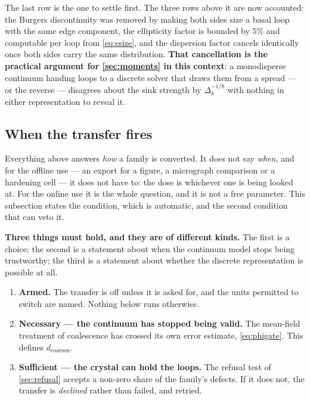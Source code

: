 \documentclass{article}
\begin{document}
The last row is the one to settle first. The three rows above it are now
accounted: the Burgers discontinuity was removed by making both sides size a
basal loop with the same edge component, the ellipticity factor is bounded by
$5\%$ and computable per loop from \cref{eq:esize}, and the dispersion factor
cancels identically once both sides carry the same distribution. \textbf{That
cancellation is the practical argument for \cref{sec:moments} in this
context}: a monodisperse continuum handing loops to a discrete solver that draws
them from a spread --- or the reverse --- disagrees about the sink strength by
$\Delta_k^{-1/8}$ with nothing in either representation to reveal it.


\subsection{When the transfer fires}
\label{sec:trigger}

Everything above answers \emph{how} a family is converted. It does not say
\emph{when}, and for the offline use --- an export for a figure, a micrograph
comparison or a hardening cell --- it does not have to: the dose is whichever one
is being looked at. For the online use it is the whole question, and it is not a
free parameter. This subsection states the condition, which is automatic, and the
second condition that can veto it.

\textbf{Three things must hold, and they are of different kinds.} The first is a
choice; the second is a statement about when the continuum model stops being
trustworthy; the third is a statement about whether the discrete representation
is possible at all.

\begin{enumerate}
\item \textbf{Armed.} The transfer is off unless it is asked for, and the units
      permitted to switch are named. Nothing below runs otherwise.
\item \textbf{Necessary --- the continuum has stopped being valid.} The
      mean-field treatment of coalescence has crossed its own error estimate,
      \cref{eq:phigate}. This defines $d_{\mathrm{coarsen}}$.
\item \textbf{Sufficient --- the crystal can hold the loops.} The refusal test of
      \cref{sec:refusal} accepts a non-zero share of the family's defects. If it
      does not, the transfer is \emph{declined} rather than failed, and retried.
\end{enumerate}
\end{document}
